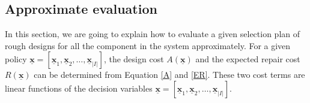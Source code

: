 \documentclass[preprint,12pt]{elsarticle}
\begin{document}


%

\subsection{Approximate evaluation}
In this section, we are going to explain how to evaluate a given selection plan of rough designs for all the component in the system approximately. For a given policy $\boldsymbol{\underline{x}}=[\boldsymbol{\underline{x}}_{1},\boldsymbol{\underline{x}}_{2},\dots,\boldsymbol{\underline{x}}_{\lvert I \rvert}]$, the design cost $A(\boldsymbol{\underline{x}})$ and the expected repair cost $R(\boldsymbol{\underline{x}})$ can be determined from Equation \eqref{A} and \eqref{ER}. These two cost terms are linear functions of the decision variables $\underline{\boldsymbol{x}}=[\boldsymbol{\underline{x}}_{1},\boldsymbol{\underline{x}}_{2},\dots,\boldsymbol{\underline{x}}_{\lvert I \rvert}]$.
\end{document}
